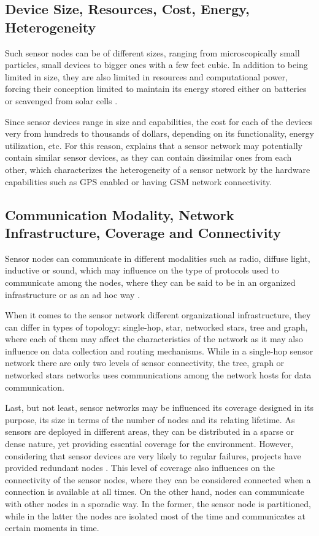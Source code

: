 \subsection{Device Size, Resources, Cost, Energy, Heterogeneity}

Such sensor nodes can be of different sizes, ranging from microscopically small
particles, small devices to bigger ones with a few feet cubic. In addition to
being limited in size, they are also limited in resources and computational
power, forcing their  conception limited to maintain its energy stored  either
on batteries or scavenged from solar cells \cite{sn-intro01}.

Since sensor devices range in size and capabilities, the cost for each of the
devices very from hundreds to thousands of dollars, depending on its
functionality, energy utilization, etc. For this reason, \cite{sn-intro01}
explains that a sensor network may potentially contain similar sensor devices,
as they can contain dissimilar ones from each other, which characterizes the
heterogeneity of a sensor network by the hardware capabilities such as GPS
enabled or having GSM network connectivity.

\subsection{Communication Modality, Network Infrastructure, Coverage and
Connectivity}
\label{sec:sn-infrastructure}

Sensor nodes can communicate in different modalities such as radio, diffuse
light, inductive or sound, which may influence on the type of protocols used to
communicate among the nodes, where they can be said to be in an organized
infrastructure or as an ad hoc way \cite{sn-intro01}.

When it comes to the sensor network different organizational infrastructure,
they can differ in types of topology: single-hop, star, networked stars, tree
and graph, where each of them may affect the characteristics of the network as
it may also influence on data collection and routing mechanisms. While in a
single-hop sensor network there are only two levels of sensor connectivity, the
tree, graph or networked stars networks uses communications among the network
hosts for data communication.

Last, but not least, sensor networks may be influenced its coverage designed in
its purpose, its size in terms of the number of nodes and its relating
lifetime. As sensors are deployed in different areas, they can be distributed
in a sparse or dense nature, yet providing essential coverage for the
environment. However, considering that sensor devices are very likely to
regular failures, projects have provided redundant nodes \cite{sn-intro01}.
This level of coverage also influences on the connectivity of the sensor
nodes, where they can be considered connected when a connection is available
at all times. On the other hand, nodes can communicate with other nodes in a
sporadic way. In the former, the sensor node is partitioned, while in the
latter the nodes are isolated most of the time and communicates at certain
moments in time.

